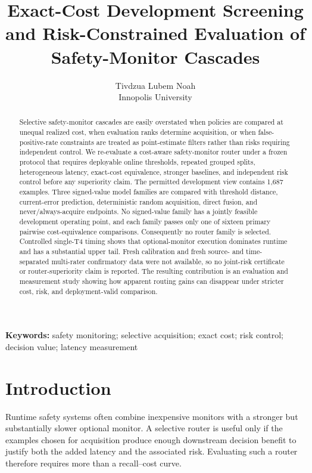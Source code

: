 \documentclass[11pt]{article}
\title{
Exact-Cost Development Screening and Risk-Constrained Evaluation
of Safety-Monitor Cascades
}
\author{
Tivdzua Lubem Noah\\
Innopolis University
}
\date{}
\newcommand{\DevelopmentN}{1,687}
\begin{document}
\maketitle

\begin{abstract}
Selective safety-monitor cascades are easily overstated when
policies are compared at unequal realized cost, when evaluation
ranks determine acquisition, or when false-positive-rate constraints
are treated as point-estimate filters rather than risks requiring
independent control. We re-evaluate a cost-aware safety-monitor
router under a frozen protocol that requires deployable online
thresholds, repeated grouped splits, heterogeneous latency,
exact-cost equivalence, stronger baselines, and independent risk
control before any superiority claim. The permitted development
view contains \DevelopmentN{} examples. Three signed-value model
families are compared with threshold distance, current-error
prediction, deterministic random acquisition, direct fusion, and
never/always-acquire endpoints. No signed-value family has a
jointly feasible development operating point, and each family
passes only one of sixteen primary pairwise cost-equivalence
comparisons. Consequently no router family is selected. Controlled
single-T4 timing shows that optional-monitor execution dominates
runtime and has a substantial upper tail. Fresh calibration and
fresh source- and time-separated multi-rater confirmatory data were
not available, so no joint-risk certificate or router-superiority
claim is reported. The resulting contribution is an evaluation and
measurement study showing how apparent routing gains can disappear
under stricter cost, risk, and deployment-valid comparison.
\end{abstract}

\noindent
\textbf{Keywords:}
safety monitoring; selective acquisition; exact cost; risk control;
decision value; latency measurement

\section{Introduction}

Runtime safety systems often combine inexpensive monitors with a
stronger but substantially slower optional monitor. A selective
router is useful only if the examples chosen for acquisition produce
enough downstream decision benefit to justify both the added
latency and the associated risk. Evaluating such a router therefore
requires more than a recall--cost curve.
\end{document}
